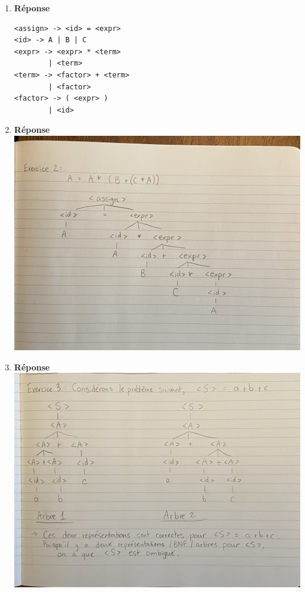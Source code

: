 \documentclass[12pt]{book}
\begin{document}
\newcommand{\reporttitle}{Devoir 1}
\newcommand{\reportauthorOne}{Kien Do}
\newcommand{\cidOne}{300163370}






\begin{enumerate}
    \item \textbf{Réponse}
\begin{verbatim}
<assign> -> <id> = <expr>
<id> -> A | B | C
<expr> -> <expr> * <term>
        | <term>
<term> -> <factor> + <term>
        | <factor>
<factor> -> ( <expr> )
        | <id>
\end{verbatim}
    \item \textbf{Réponse}\\
    
    \includegraphics[scale=0.12]{ex2.png}
    
    \newpage
    
    \item \textbf{Réponse}\\
    
    \includegraphics[scale=0.12]{ex3.png}
    

\end{enumerate}
\end{document}
